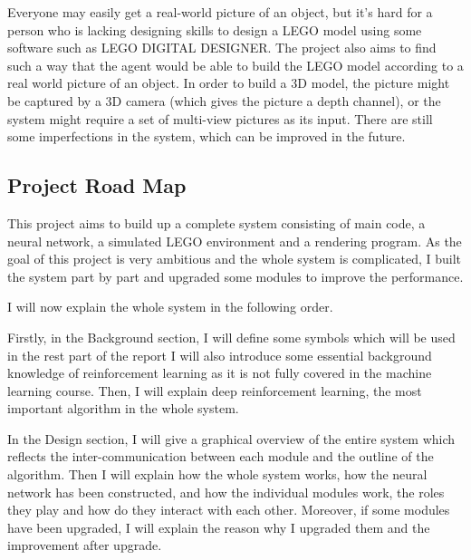 \documentclass[a4paper]{article}
\begin{document}
            Everyone may easily get a real-world picture of an object, but it’s hard
            for a person who is lacking designing skills to design a LEGO model using
            some software such as LEGO DIGITAL DESIGNER. The project also aims to find
            such a way that the agent would be able to build the LEGO model according
            to a real world picture of an object. In order to build a 3D model, the
            picture might be captured by a 3D camera (which gives the picture a depth
            channel), or the system might require a set of multi-view pictures as its
            input. There are still some imperfections in the system, which can be
            improved in the future.
            
        \subsection{Project Road Map}
            This project aims to build up a complete system consisting of main code,
            a neural network, a simulated LEGO environment and a rendering program.
            As the goal of this project is very ambitious and the whole system is
            complicated, I built the system part by part and upgraded some modules
            to improve the performance. 
            
            I will now explain the whole system in the following order. 
            
            Firstly, in the Background section, I will define some symbols which
            will be used in the rest part of the report I will also introduce some
            essential background knowledge of reinforcement learning as it is not
            fully covered in the machine learning course. Then, I will explain deep
            reinforcement learning, the most important algorithm in the whole system. 
            
            In the Design section, I will give a graphical overview of the entire
            system which reflects the inter-communication between each module and
            the outline of the algorithm. Then I will explain how the whole system
            works, how the neural network has been constructed, and how the individual
            modules work, the roles they play and how do they interact with each other.
            Moreover, if some modules have been upgraded, I will explain the reason why
            I upgraded them and the improvement after upgrade. 
            
\end{document}
